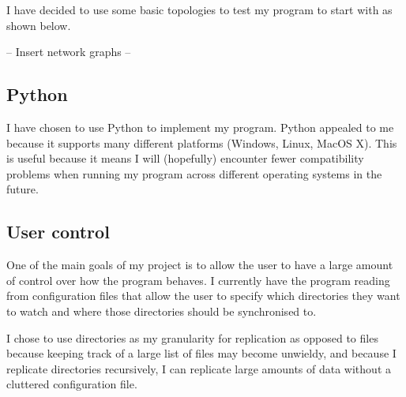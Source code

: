 \documentclass[12pt]{article}
\begin{document}
I have decided to use some basic topologies to
test my program to start with as shown below.

-- Insert network graphs --


\subsection{Python}
I have chosen to use Python to implement
my program. Python appealed to me because it
supports many different platforms (Windows, Linux, MacOS X).
This is useful because it means I will (hopefully)
encounter fewer compatibility problems when running
my program across different operating systems in the future.


\subsection{User control}
One of the main goals of my project is to allow the user
to have a  large amount of control over how the program
behaves. I currently have the program reading from
configuration files that allow the user to specify
which directories they want to watch and where those
directories should be synchronised to.

I chose to use directories as my granularity for replication
as opposed to files because keeping track of a large list
of files may become unwieldy,
and because I replicate
directories recursively, I can replicate large amounts
of data without a cluttered configuration file.
\end{document}
